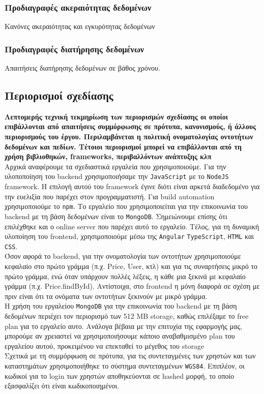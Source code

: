 \subsubsection{Προδιαγραφές ακεραιότητας δεδομένων}
Κανόνες ακεραιότητας και εγκυρότητας δεδομένων
\subsubsection{Προδιαγραφές διατήρησης δεδομένων}
Απαιτήσεις διατήρησης δεδομένων σε βάθος χρόνου.
\subsection{Περιορισμοί σχεδίασης}
\textbf{Λεπτομερής τεχνική τεκμηρίωση των περιορισμών σχεδίασης οι οποίοι επιβάλλονται από απαιτήσεις συμμόρφωσης σε πρότυπα, κανονισμούς, ή άλλους περιορισμούς του έργου. Περιλαμβάνεται η πολιτική
ονοματολογίας οντοτήτων δεδομένων και πεδίων. Τέτοιοι περιορισμοί μπορεί να επιβάλλονται από τη χρήση βιβλιοθηκών, frameworks, περιβαλλόντων ανάπτυξης κλπ} \\
Αρχικά αναφέρουμε τα σχεδιαστικά εργαλεία που χρησιμοποιούμε. Για την υλοποποίηση του backend χρησιμοποιήσαμε την \texttt{JavaScript} με το \texttt{NodeJS} framework. Η επιλογή αυτού του framework έγινε διότι είναι αρκετά διαδεδομένο για την ευελιξία που παρέχει στον προγραμματιστή. Για build automation χρησιμοποιούμε το \texttt{npm}. Το εργαλείο που χρησιμοποιείται για την επικοινωνία του backend με τη βάση δεδομένων είναι το \texttt{MongoDB}. Σημειώνουμε επίσης ότι επιλέχθηκε και ο online server που παρέχει αυτό το εργαλείο. Τέλος, για τη δυναμική υλοποίηση του frontend, χρησιμοποιούμε μέσω της \texttt{Angular} \texttt{TypeScript}, \texttt{HTML} και \texttt{CSS}.\\
Όσον αφορά το backend, για την ονοματολογία των οντοτήτων χρησιμοποιούμε κεφαλαίο στο πρώτο γράμμα (π.χ. Price, User, κτλ) και για τις συναρτήσεις μικρό το πρώτο γράμμα, ενώ όταν υπάρχουν πολλές λέξεις, η κάθε μια ξεκινά με κεφαλαίο γράμμα (π.χ. Price.findById).
Αντίστοιχα, στο frontend η μόνη διαφορά σε σχέση με πριν είναι ότι τα ονόματα των οντοτήτων ξεκινούν με μικρό γράμμα. \\
Η χρήση του εργαλείου \texttt{MongoDB} για την επικοινωνία του backend με τη βάση δεδομένων περιέχει τον περιορισμό των 512 MB storage, καθώς επιλέξαμε το free plan για το εργαλείο αυτο. Ανάλογα βέβαια με την επιτυχία της εφαρμογής μας, μπορούμε αν χρειαστεί να χρησιμοποιήσουμε κάποιο αναβαθμισμένο plan του εργαλείου αυτού, προκειμένου να επεκταθεί το μέγεθος του storage \\
Σχετικά με τη συμμόρφωση σε πρότυπα, για τις συντεταγμένες των χρηστών και των καταστημάτων χρησιμοποιήθηκε το σύστημα συντεταγμένων \texttt{WGS84}. Επιπλέον, οι κωδικοί για το login των χρηστών αποθηκεύονται σε hashed μορφή, το οποίο εξασφαλίζει ότι είναι κωδικοποιημένοι.

